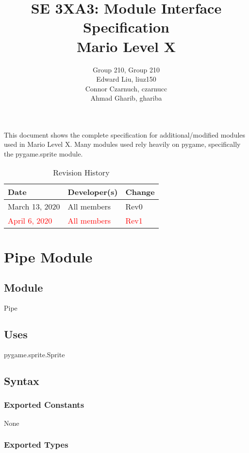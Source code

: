 \documentclass[12pt]{article}
\title{SE 3XA3: Module Interface Specification\\Mario Level X}
\author{Group 210, Group 210
		\\ Edward Liu, liuz150
		\\ Connor Czarnuch, czarnucc
		\\ Ahmad Gharib, ghariba
}
\begin{document}
 
\maketitle

\noindent This document shows the complete specification for additional/modified modules used in Mario Level X. Many modules used rely heavily on pygame, specifically the pygame.sprite module.

\begin{table}[hp]
\caption{Revision History} \label{TblRevisionHistory}
\begin{tabularx}{\textwidth}{llX}
\toprule
\textbf{Date} & \textbf{Developer(s)} & \textbf{Change}\\
\midrule
March 13, 2020 & All members & Rev0\\
\textcolor{red}{April 6, 2020} & \textcolor{red}{All members} & \textcolor{red}{Rev1}\\
\bottomrule
\end{tabularx}
\end{table}

\newpage

\section* {Pipe Module}

\subsection*{Module}

Pipe

\subsection* {Uses}

pygame.sprite.Sprite

\subsection* {Syntax}

\subsubsection* {Exported Constants}

None

\subsubsection* {Exported Types}
\end{document}
